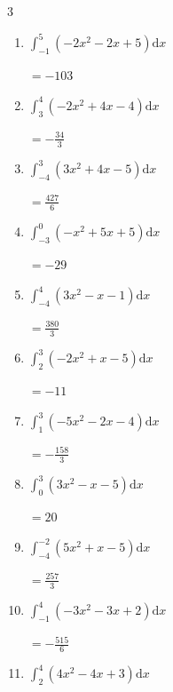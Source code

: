 \begin{multicols}{3}
\begin{enumerate}
        $\displaystyle =\frac{70}{3}$

  \item $\displaystyle \int_{-1}^{5}\left( -2x^{2}-2x+5 \right) \mathrm{d}x$

        $\displaystyle =-103$

\columnbreak %

  \item $\displaystyle \int_{3}^{4}\left( -2x^{2}+4x-4 \right) \mathrm{d}x$

        $\displaystyle =-\frac{34}{3}$

  \item $\displaystyle \int_{-4}^{3}\left( 3x^{2}+4x-5 \right) \mathrm{d}x$

        $\displaystyle =\frac{427}{6}$

  \item $\displaystyle \int_{-3}^{0}\left( -x^{2}+5x+5 \right) \mathrm{d}x$

        $\displaystyle =-29$

  \item $\displaystyle \int_{-4}^{4}\left( 3x^{2}-x-1 \right) \mathrm{d}x$

        $\displaystyle =\frac{380}{3}$

  \item $\displaystyle \int_{2}^{3}\left( -2x^{2}+x-5 \right) \mathrm{d}x$

        $\displaystyle =-11$

\columnbreak %

  \item $\displaystyle \int_{1}^{3}\left( -5x^{2}-2x-4 \right) \mathrm{d}x$

        $\displaystyle =-\frac{158}{3}$

  \item $\displaystyle \int_{0}^{3}\left( 3x^{2}-x-5 \right) \mathrm{d}x$

        $\displaystyle =20$

  \item $\displaystyle \int_{-4}^{-2}\left( 5x^{2}+x-5 \right) \mathrm{d}x$

        $\displaystyle =\frac{257}{3}$

  \item $\displaystyle \int_{-1}^{4}\left( -3x^{2}-3x+2 \right) \mathrm{d}x$

        $\displaystyle =-\frac{515}{6}$

  \item $\displaystyle \int_{2}^{4}\left( 4x^{2}-4x+3 \right) \mathrm{d}x$


\end{enumerate}
\end{multicols}
